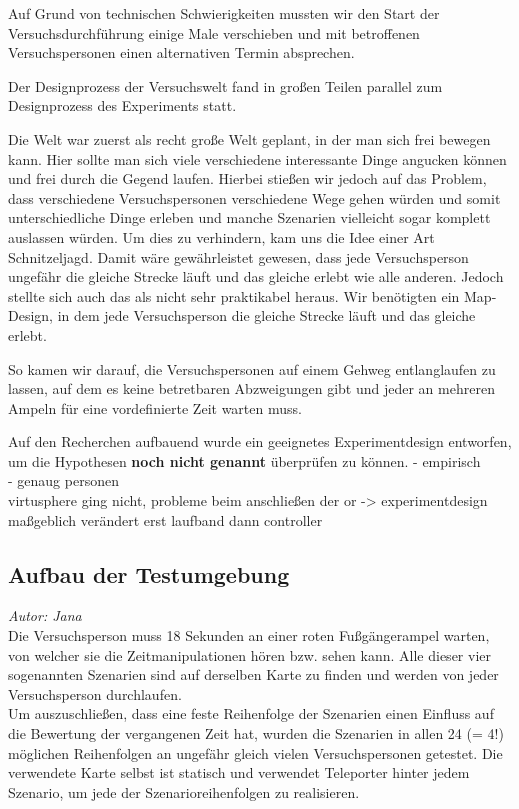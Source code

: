 \documentclass{Bericht}
\begin{document}
		Auf Grund von technischen Schwierigkeiten mussten wir den Start der Versuchsdurchführung einige Male verschieben und mit betroffenen Versuchspersonen einen alternativen Termin absprechen. 

		Der Designprozess der Versuchswelt fand in großen Teilen parallel zum Designprozess des Experiments statt. 
	


Die Welt war zuerst als recht große Welt geplant, in der man sich frei bewegen kann. Hier sollte man sich viele verschiedene interessante Dinge angucken können und frei durch die Gegend laufen. Hierbei stießen wir jedoch auf das Problem, dass verschiedene Versuchspersonen verschiedene Wege gehen würden und somit unterschiedliche Dinge erleben und manche Szenarien vielleicht sogar komplett auslassen würden. Um dies zu verhindern, kam uns die Idee einer Art Schnitzeljagd. Damit wäre gewährleistet gewesen, dass jede Versuchsperson ungefähr die gleiche Strecke läuft und das gleiche erlebt wie alle anderen. Jedoch stellte sich auch das als nicht sehr praktikabel heraus. Wir benötigten ein Map-Design, in dem jede Versuchsperson die gleiche Strecke läuft und das gleiche erlebt.

		So kamen wir darauf, die Versuchspersonen auf einem Gehweg entlanglaufen zu lassen, auf dem es keine betretbaren Abzweigungen gibt und jeder an mehreren Ampeln für eine vordefinierte Zeit warten muss. 
		
Auf den Recherchen aufbauend wurde ein geeignetes Experimentdesign entworfen, um die Hypothesen \textbf{noch nicht genannt} überprüfen zu können. 
- empirisch \\
- genaug personen \\

virtusphere ging nicht, probleme beim anschließen der or -> experimentdesign maßgeblich verändert 
erst laufband dann controller 


\subsection{Aufbau der Testumgebung}
\textit{Autor: Jana}\\
	 
  Die Versuchsperson muss 18 Sekunden an einer roten Fußgängerampel warten, von welcher sie die Zeitmanipulationen hören bzw. sehen kann.
Alle dieser vier sogenannten Szenarien sind auf derselben Karte zu finden und werden von jeder Versuchsperson durchlaufen.\\
Um auszuschließen, dass eine feste Reihenfolge der Szenarien einen Einfluss auf die Bewertung der vergangenen Zeit hat, wurden die Szenarien in allen 24 (= 4!) möglichen Reihenfolgen an ungefähr gleich vielen Versuchspersonen getestet. Die verwendete Karte selbst ist statisch und verwendet Teleporter hinter jedem Szenario, um jede der Szenarioreihenfolgen zu realisieren.
\end{document}
